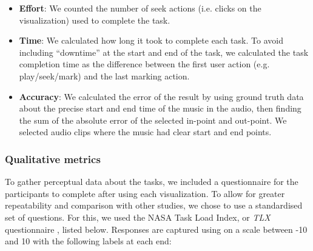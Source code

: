 \begin{itemize}
  \item \textbf{Effort}: We counted the number of seek actions (i.e. clicks on the visualization) used to complete the
    task.
  \item \textbf{Time}: We calculated how long it took to complete each task. To avoid including ``downtime'' at the
    start and end of the task, we calculated the task completion time as the difference between the first user action
    (e.g.  play/seek/mark) and the last marking action.
  \item \textbf{Accuracy}: We calculated the error of the result by using ground truth data about the precise start and
    end time of the music in the audio, then finding the sum of the absolute error of the selected in-point and
    out-point. We selected audio clips where the music had clear start and end points.
\end{itemize}

\subsubsection{Qualitative metrics}

To gather perceptual data about the tasks, we included a questionnaire for the participants to complete after using
each visualization. To allow for greater repeatability and comparison with other studies, we chose to use a
standardised set of questions. For this, we used the NASA Task Load Index, or \textit{TLX} questionnaire
\citep{Hart1988}, listed below.  Responses are captured using on a scale between -10 and 10 with the following labels
at each end:


